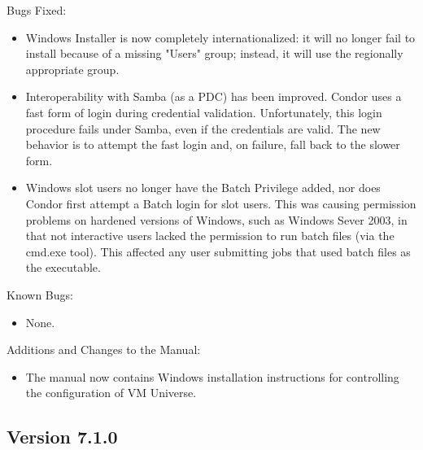\noindent Bugs Fixed:

\begin{itemize}

\item Windows Installer is now completely internationalized: it will no 
  longer fail to install because of a missing "Users" group; instead, it
  will use the regionally appropriate group.

\item Interoperability with Samba (as a PDC) has been improved.  Condor 
  uses a fast form of login during credential validation.  Unfortunately, 
  this login procedure fails under Samba, even if the credentials are 
  valid.  The new behavior is to attempt the fast login and, on failure, 
  fall back to the slower form.

\item Windows slot users no longer have the Batch Privilege added, nor 
  does Condor first attempt a Batch login for slot users.  This was 
  causing permission problems on hardened versions of Windows, such 
  as Windows Sever 2003, in that not interactive users lacked the 
  permission to run batch files (via the cmd.exe tool). This affected 
  any user submitting jobs that used batch files as the executable.

\end{itemize}

\noindent Known Bugs:

\begin{itemize}

\item None.

\end{itemize}

\noindent Additions and Changes to the Manual:

\begin{itemize}

\item The manual now contains Windows installation instructions for
  controlling the configuration of VM Universe.

\end{itemize}



\subsection*{\label{sec:New-7-1-0}Version 7.1.0}

